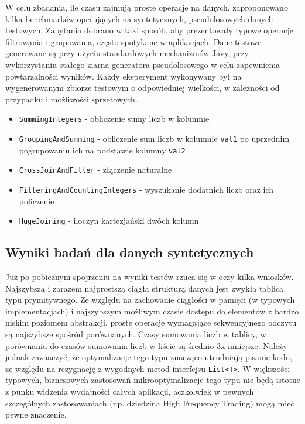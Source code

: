 \documentclass[12pt]{extarticle}
\begin{document}
    W celu zbadania, ile czasu zajmują proste operacje na danych, zaproponowano kilka benchmarków operujących na syntetycznych, pseudolosowych danych testowych. Zapytania dobrano w taki sposób, aby prezentowały typowe operacje filtrowania i grupowania, często spotykane w aplikacjach. Dane testowe generowane są przy użyciu standardowych mechanizmów Javy, przy wykorzystaniu stałego ziarna generatora pseudolosowego w celu zapewnienia powtarzalności wyników. Każdy eksperyment wykonywany był na wygenerowanym zbiorze testowym o odpowiedniej wielkości, w zależności od przypadku i możliwości sprzętowych.

\begin{itemize}
    \item \texttt{SummingIntegers} - obliczenie sumy liczb w kolumnie
    \item \texttt{GroupingAndSumming} - obliczenie sum liczb w kolumnie \texttt{val1} po uprzednim pogrupowaniu ich na podstawie kolumny \texttt{val2}
    \item \texttt{CrossJoinAndFilter} - złączenie naturalne
    \item \texttt{FilteringAndCountingIntegers} - wyszukanie dodatnich liczb oraz ich policzenie
    \item \texttt{HugeJoining} - iloczyn kartezjański dwóch kolumn
\end{itemize}


\subsection{Wyniki badań dla danych syntetycznych}

    Już po pobieżnym spojrzeniu na wyniki testów rzuca się w oczy kilka wniosków. Najszybszą i zarazem najprostszą ciągła strukturą danych jest zwykła tablica typu prymitywnego. Ze względu na zachowanie ciągłości w pamięci (w typowych implementacjach) i najszybszym możliwym czasie dostępu do elementów z bardzo niskim poziomem abstrakcji, proste operacje wymagające sekwencyjnego odczytu są najszybsze spośród porównanych. Czasy sumowania liczb w tablicy, w porównaniu do czasów sumowania liczb w liście są średnio 3x mniejsze. Należy jednak zaznaczyć, że optymalizacje tego typu znacząco utrudniają pisanie kodu, ze względu na rezygnację z wygodnych metod interfejsu \texttt{List<T>}. W większości typowych, biznesowych zastosowań mikrooptymalizacje tego typu nie będą istotne z punku widzenia wydajności całych aplikacji, aczkolwiek w pewnych szczególnych zastosowaniach (np. dziedzina High Frequency Trading) mogą mieć pewne znaczenie.
\end{document}
